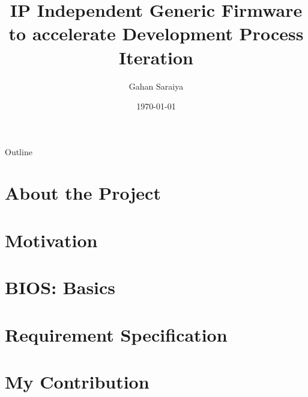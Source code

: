\documentclass{beamer}
\title{IP Independent Generic Firmware to accelerate Development Process Iteration}
\date{\today}
\author[Gahan Saraiya]{Gahan Saraiya}
\institute[18MCEC10]
{
  Institute of Technology\\
  Nirma University
}
\begin{document}
\begin{frame}
\titlepage
\end{frame}


    
\begin{frame}{Outline}
    \tableofcontents
\end{frame}

\section{About the Project}


\section{Motivation}


\section{BIOS: Basics}
% 


\section{Requirement Specification}


\section{My Contribution}


%
%
%
\end{document}
